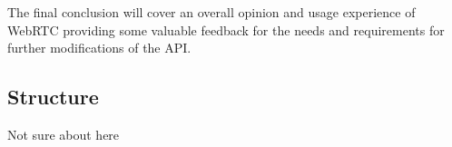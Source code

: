 The final conclusion will cover an overall opinion and usage experience of WebRTC providing some valuable feedback for the needs and requirements for further modifications of the API.

\subsection{Structure}

Not sure about here